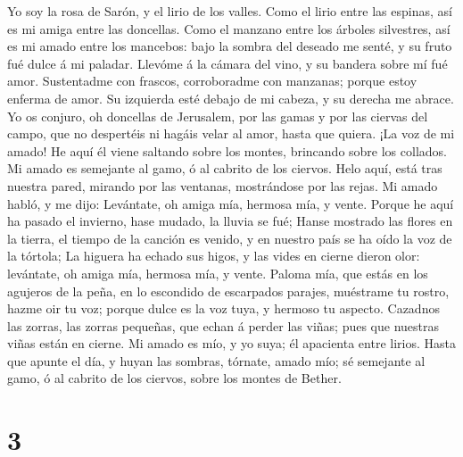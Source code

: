 Yo soy la rosa de Sarón, y el lirio de los valles.
 Como el lirio entre las espinas, así es mi amiga entre
las doncellas.  Como el manzano entre los árboles
silvestres, así es mi amado entre los mancebos: bajo la sombra del
deseado me senté, y su fruto fué dulce á mi paladar. 
Llevóme á la cámara del vino, y su bandera sobre mí fué amor.
 Sustentadme con frascos, corroboradme con manzanas;
porque estoy enferma de amor.  Su izquierda esté debajo de
mi cabeza, y su derecha me abrace.  Yo os conjuro, oh
doncellas de Jerusalem, por las gamas y por las ciervas del campo, que
no despertéis ni hagáis velar al amor, hasta que quiera. 
¡La voz de mi amado! He aquí él viene saltando sobre los montes,
brincando sobre los collados.  Mi amado es semejante al
gamo, ó al cabrito de los ciervos. Helo aquí, está tras nuestra pared,
mirando por las ventanas, mostrándose por las rejas.  Mi
amado habló, y me dijo: Levántate, oh amiga mía, hermosa mía, y vente.
 Porque he aquí ha pasado el invierno, hase mudado, la
lluvia se fué;  Hanse mostrado las flores en la tierra,
el tiempo de la canción es venido, y en nuestro país se ha oído la voz
de la tórtola;  La higuera ha echado sus higos, y las
vides en cierne dieron olor: levántate, oh amiga mía, hermosa mía, y
vente.  Paloma mía, que estás en los agujeros de la peña,
en lo escondido de escarpados parajes, muéstrame tu rostro, hazme oir tu
voz; porque dulce es la voz tuya, y hermoso tu aspecto. 
Cazadnos las zorras, las zorras pequeñas, que echan á perder las viñas;
pues que nuestras viñas están en cierne.  Mi amado es
mío, y yo suya; él apacienta entre lirios.  Hasta que
apunte el día, y huyan las sombras, tórnate, amado mío; sé semejante al
gamo, ó al cabrito de los ciervos, sobre los montes de Bether.

\hypertarget{section-2}{%
\section{3}\label{section-2}}

